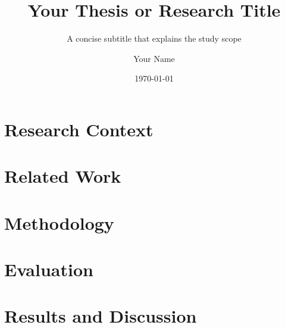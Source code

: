 \documentclass[aspectratio=169,11pt]{beamer}
\title{Your Thesis or Research Title}
\subtitle{A concise subtitle that explains the study scope}
\author{Your Name}
\institute{Your Department or Institute\\Your University or Organization}
\date{\today}
\begin{document}



\ResearchStyle
\section{Research Context}







\ResearchStyle
\section{Related Work}



\MethodStyle
\section{Methodology}






\MethodStyle
\section{Evaluation}





\ResultStyle
\section{Results and Discussion}




\end{document}
